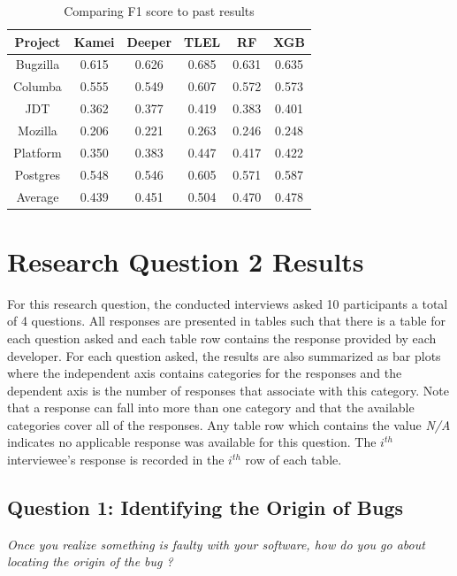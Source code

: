 \documentclass[../main.tex]{subfiles}
\begin{document}
\begin{table}[H] 
\centering 
\begin{tabular}{|c c c c c c|} 
\hline 
Project & Kamei & Deeper & TLEL & RF & XGB\\ 
\hline \hline 
Bugzilla & 0.615 & 0.626 & 0.685 & 0.631 & 0.635 \\ 
\hline 
Columba & 0.555 & 0.549 & 0.607 & 0.572 & 0.573\\ 
\hline 
JDT & 0.362 & 0.377 & 0.419 & 0.383 & 0.401 \\ 
\hline 
Mozilla & 0.206 & 0.221 & 0.263 & 0.246 & 0.248\\ 
\hline 
Platform & 0.350 & 0.383 & 0.447 & 0.417 & 0.422\\ 
\hline 
Postgres & 0.548 & 0.546 & 0.605 & 0.571 & 0.587\\ 
\hline 
Average & 0.439 & 0.451 & 0.504 & 0.470 & 0.478\\ 
\hline 
\end{tabular} 
\caption{Comparing F1 score to past results} 
\label{table:exp4_F1} 
\end{table} 


\section{Research Question 2 Results}

For this research question, the conducted interviews asked 10 participants a total of 4 questions. All responses are presented in tables such that there is a table for each question asked and each table row contains the response provided by each developer. For each question asked, the results are also summarized as bar plots where the independent axis contains categories for the responses and the dependent axis is the number of responses that associate with this category. Note that a response can fall into more than one category and that the available categories cover all of the responses. Any table row which contains the value \textit{N/A} indicates no applicable response was available for this question. The $i^{th}$ interviewee's response is recorded in the $i^{th}$ row of each table.

\subsection{Question 1: Identifying the Origin of Bugs}

\textit{Once you realize something is faulty with your software, how do you go about locating the origin of the bug ?}
\end{document}
